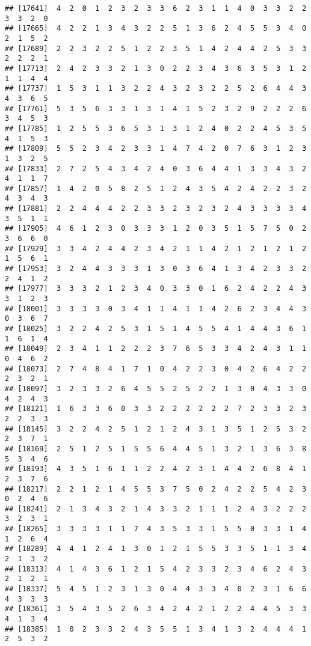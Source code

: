 \documentclass[
]{article}
\begin{document}
\begin{verbatim}
## [17641]  4  2  0  1  2  3  2  3  3  6  2  3  1  1  4  0  3  3  2  2  3  3  2  0
## [17665]  4  2  2  1  3  4  3  2  2  5  1  3  6  2  4  5  5  3  4  0  2  1  5  2
## [17689]  2  2  3  2  2  5  1  2  2  3  5  1  4  2  4  4  2  5  3  3  2  2  2  1
## [17713]  2  4  2  3  3  2  1  3  0  2  2  3  4  3  6  3  5  3  1  2  1  1  4  4
## [17737]  1  5  3  1  1  3  2  2  4  3  2  3  2  2  5  2  6  4  4  3  4  3  6  5
## [17761]  5  3  5  6  3  3  1  3  1  4  1  5  2  3  2  9  2  2  2  6  3  4  5  3
## [17785]  1  2  5  5  3  6  5  3  1  3  1  2  4  0  2  2  4  5  3  5  4  1  5  3
## [17809]  5  5  2  3  4  2  3  3  1  4  7  4  2  0  7  6  3  1  2  3  1  3  2  5
## [17833]  2  7  2  5  4  3  4  2  4  0  3  6  4  4  1  3  3  4  3  2  4  1  1  7
## [17857]  1  4  2  0  5  8  2  5  1  2  4  3  5  4  2  4  2  2  3  2  4  3  4  3
## [17881]  2  2  4  4  4  2  2  3  3  2  3  2  3  2  4  3  3  3  3  4  3  5  1  1
## [17905]  4  6  1  2  3  0  3  3  3  1  2  0  3  5  1  5  7  5  0  2  3  6  6  0
## [17929]  3  3  4  2  4  4  2  3  4  2  1  1  4  2  1  2  1  2  1  2  1  5  6  1
## [17953]  3  2  4  4  3  3  3  1  3  0  3  6  4  1  3  4  2  3  3  2  2  4  1  2
## [17977]  3  3  3  2  1  2  3  4  0  3  3  0  1  6  2  4  2  2  4  3  3  1  2  3
## [18001]  3  3  3  3  0  3  4  1  1  4  1  1  4  2  6  2  3  4  4  3  0  3  6  7
## [18025]  3  2  2  4  2  5  3  1  5  1  4  5  5  4  1  4  4  3  6  1  1  6  1  4
## [18049]  2  3  4  1  1  2  2  2  3  7  6  5  3  3  4  2  4  3  1  1  0  4  6  2
## [18073]  2  7  4  8  4  1  7  1  0  4  2  2  3  0  4  2  6  4  2  2  2  3  2  1
## [18097]  3  2  3  3  2  6  4  5  5  2  5  2  2  1  3  0  4  3  3  0  4  2  4  3
## [18121]  1  6  3  3  6  0  3  3  2  2  2  2  2  2  7  2  3  3  2  3  2  2  3  3
## [18145]  3  2  2  4  2  5  1  2  1  2  4  3  1  3  5  1  2  5  3  2  2  3  7  1
## [18169]  2  5  1  2  5  1  5  5  6  4  4  5  1  3  2  1  3  6  3  8  5  3  4  6
## [18193]  4  3  5  1  6  1  1  2  2  4  2  3  1  4  4  2  6  8  4  1  2  3  7  6
## [18217]  2  2  1  2  1  4  5  5  3  7  5  0  2  4  2  2  5  4  2  3  0  2  4  6
## [18241]  2  1  3  4  3  2  1  4  3  3  2  1  1  1  2  4  3  2  2  2  3  2  3  1
## [18265]  3  3  3  3  1  1  7  4  3  5  3  3  1  5  5  0  3  3  1  4  1  2  6  4
## [18289]  4  4  1  2  4  1  3  0  1  2  1  5  5  3  3  5  1  1  3  4  2  1  3  2
## [18313]  4  1  4  3  6  1  2  1  5  4  2  3  3  2  3  4  6  2  4  3  2  1  2  1
## [18337]  5  4  5  1  2  3  1  3  0  4  4  3  3  4  0  2  3  1  6  6  4  3  3  3
## [18361]  3  5  4  3  5  2  6  3  4  2  4  2  1  2  2  4  4  5  3  3  4  1  3  4
## [18385]  1  0  2  3  3  2  4  3  5  5  1  3  4  1  3  2  4  4  4  1  2  5  3  2

\end{verbatim}
\end{document}
